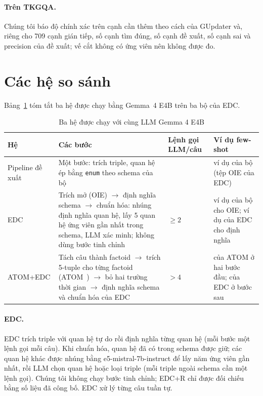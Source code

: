 \paragraph*{Trên TKGQA.}
Chúng tôi báo độ chính xác trên cạnh cần thêm theo cách của GUpdater và, riêng cho 709 cạnh gián tiếp, số cạnh tìm đúng, số cạnh đề xuất, số cạnh sai và precision của đề xuất; vế cắt không có ứng viên nên không được đo.

\section{Các hệ so sánh}\label{sec:exp-systems}

Bảng~\ref{tab:systems} tóm tắt ba hệ được chạy bằng Gemma~4 E4B trên ba bộ của EDC.

\begin{table}[htbp]
\centering
\caption{Ba hệ được chạy với cùng LLM Gemma 4 E4B}\label{tab:systems}
\small
\begin{tabular}{>{\raggedright\arraybackslash}p{2.1cm} >{\raggedright\arraybackslash}p{7.8cm} >{\centering\arraybackslash}p{1.8cm} >{\raggedright\arraybackslash}p{2.3cm}}
\toprule
\textbf{Hệ} & \textbf{Các bước} & \textbf{Lệnh gọi LLM/câu} & \textbf{Ví dụ few-shot} \\
\midrule
Pipeline đề xuất & Một bước: trích triple, quan hệ ép bằng \texttt{enum} theo schema của bộ & 1 & 6 ví dụ của bộ (tệp OIE của EDC) \\
EDC~\cite{zhang2024edc} & Trích mở (OIE) $\rightarrow$ định nghĩa schema $\rightarrow$ chuẩn hóa: nhúng định nghĩa quan hệ, lấy 5 quan hệ ứng viên gần nhất trong schema, LLM xác minh; không dùng bước tinh chỉnh & $\geq 2$ & 6 ví dụ của bộ cho OIE; ví dụ của EDC cho định nghĩa \\
ATOM+EDC & Tách câu thành factoid $\rightarrow$ trích 5-tuple cho từng factoid (ATOM~\cite{lairgi2025atom,lairgi2024itext2kg}) $\rightarrow$ bỏ hai trường thời gian $\rightarrow$ định nghĩa schema và chuẩn hóa của EDC & $> 4$ & của ATOM ở hai bước đầu; của EDC ở bước sau \\
\bottomrule
\end{tabular}
\end{table}


\paragraph*{EDC.}
EDC trích triple với quan hệ tự do rồi định nghĩa từng quan hệ (mỗi bước một lệnh gọi mỗi câu). Khi chuẩn hóa, quan hệ đã có trong schema được giữ; các quan hệ khác được nhúng bằng e5-mistral-7b-instruct để lấy năm ứng viên gần nhất, rồi LLM chọn quan hệ hoặc loại triple (mỗi triple ngoài schema cần một lệnh gọi).
Chúng tôi không chạy bước tinh chỉnh; EDC+R chỉ được đối chiếu bằng số liệu đã công bố. EDC xử lý từng câu tuần tự.

